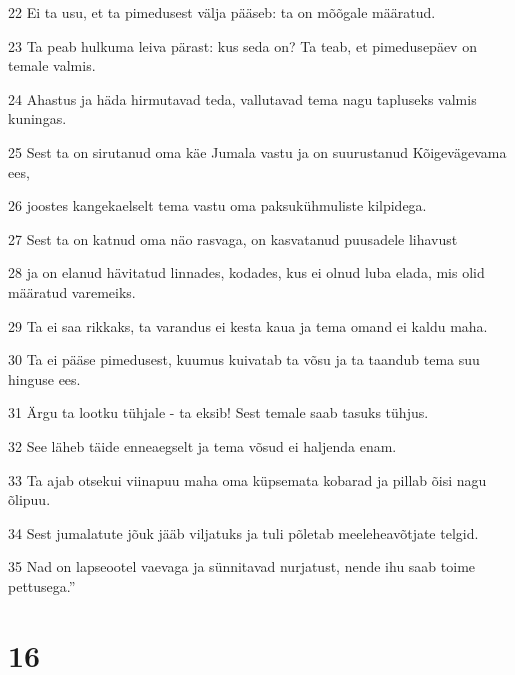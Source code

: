 \par 22 Ei ta usu, et ta pimedusest välja pääseb: ta on mõõgale määratud.
\par 23 Ta peab hulkuma leiva pärast: kus seda on? Ta teab, et pimedusepäev on temale valmis.
\par 24 Ahastus ja häda hirmutavad teda, vallutavad tema nagu tapluseks valmis kuningas.
\par 25 Sest ta on sirutanud oma käe Jumala vastu ja on suurustanud Kõigevägevama ees,
\par 26 joostes kangekaelselt tema vastu oma paksukühmuliste kilpidega.
\par 27 Sest ta on katnud oma näo rasvaga, on kasvatanud puusadele lihavust
\par 28 ja on elanud hävitatud linnades, kodades, kus ei olnud luba elada, mis olid määratud varemeiks.
\par 29 Ta ei saa rikkaks, ta varandus ei kesta kaua ja tema omand ei kaldu maha.
\par 30 Ta ei pääse pimedusest, kuumus kuivatab ta võsu ja ta taandub tema suu hinguse ees.
\par 31 Ärgu ta lootku tühjale - ta eksib! Sest temale saab tasuks tühjus.
\par 32 See läheb täide enneaegselt ja tema võsud ei haljenda enam.
\par 33 Ta ajab otsekui viinapuu maha oma küpsemata kobarad ja pillab õisi nagu õlipuu.
\par 34 Sest jumalatute jõuk jääb viljatuks ja tuli põletab meeleheavõtjate telgid.
\par 35 Nad on lapseootel vaevaga ja sünnitavad nurjatust, nende ihu saab toime pettusega.”

\chapter{16}

